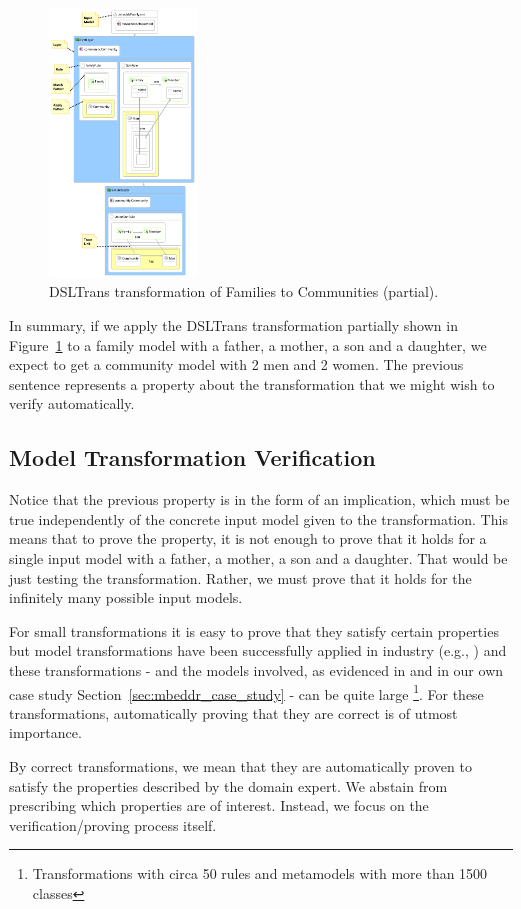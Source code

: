 \begin{figure}
\begin{center}
  \includegraphics[width=0.35\textwidth]{figures/families_to_persons_hot2}
  \caption{DSLTrans transformation of Families to Communities (partial).}
  \label{fig:families_mm}
\end{center}
\end{figure}

In summary, if we apply the DSLTrans transformation partially shown in  Figure~\ref{fig:families_mm} to a family model with a father, a mother, a son and a daughter, we expect to get a community model with 2 men and 2 women. The previous sentence represents a property about the transformation that we might wish to verify automatically.

\subsection{Model Transformation Verification}

Notice that the previous property is in the form of an implication, which must be true independently of the concrete input model given to the transformation.
This means that to prove the property, it is not enough to prove that it holds for a single input model with a father, a mother, a son and a daughter. That would be just testing the transformation.
Rather, we must prove that it holds for the infinitely many possible input models.

For small transformations it is easy to prove that they satisfy certain
properties but model transformations have been successfully applied in industry
(e.g., \cite{daghsen:hal-00660252,Giese2010}) and these transformations - and
the models involved, as evidenced in \cite{Selim2012} and in our own case study
Section~\ref{sec:mbeddr_case_study} - can be quite large
\footnote{Transformations with circa 50 rules and metamodels with more than 1500
classes}.
For these transformations, automatically proving that they are correct is of utmost importance.

By correct transformations, we mean that they are automatically proven to satisfy the properties described by the domain expert. We abstain from prescribing which properties are of interest. Instead, we focus on the verification/proving process itself.



